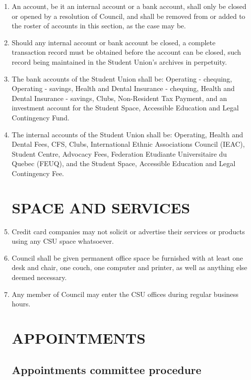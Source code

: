 \documentclass[oneside]{book}
\begin{document}
\begin{enumerate}
\item An account, be it an internal account or a bank account, shall only be closed or opened by a resolution of Council, and shall be removed from or added to the roster of accounts in this section, as the case may be. 
\item Should any internal account or bank account be closed, a complete transaction record must be obtained before the account can be closed, such record being maintained in the Student Union’s archives in perpetuity.
\item \label{bank_accounts} The bank accounts of the Student Union shall be: Operating - chequing, Operating - savings, Health and Dental Insurance - chequing, Health and Dental Insurance - savings, Clubs, Non-Resident Tax Payment, and an investment account for the Student Space, Accessible Education and Legal Contingency Fund.
\item \label{internal_accounts} The internal accounts of the Student Union shall be: Operating, Health and Dental Fees, CFS, Clubs, International Ethnic Associations Council (IEAC), Student Centre, Advocacy Fees, Federation Etudiante Universitaire du Quebec (FEUQ), and the Student Space, Accessible Education and Legal Contingency Fee.

\part{\label{SPACE_AND_SERVICES}SPACE AND SERVICES }
\item Credit card companies may not solicit or advertise their services
or products using any CSU space whatsoever. 
\item Council shall be given permanent office space be furnished with at
least one desk and chair, one couch, one computer and printer, as
well as anything else deemed necessary. 
\item Any member of Council may enter the CSU offices during regular business
hours. 

\part{\label{APPOINTMENTS}APPOINTMENTS }


\chapter{\label{Appointments_committee_procedure}Appointments committee procedure }



\end{enumerate}
\end{document}
